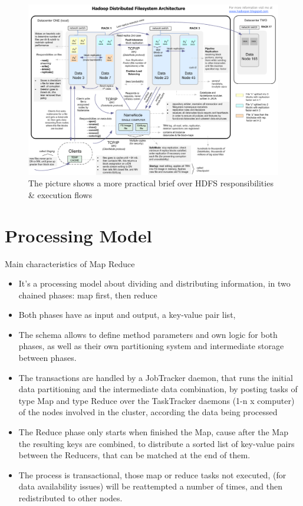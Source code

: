 \begin{figure}
\caption{The picture shows a more practical brief over HDFS responsibilities \& execution flows}
\label{tab:hdfs_resposibilities_and_execution_flow}
\centering
\includegraphics[scale=.33]{./img/HadoopDFSArchitecture.png}
\end{figure}


\section{Processing Model}
Main characteristics of Map Reduce   \\

\begin{itemize}
\item It's a processing model about dividing and distributing information, in two chained phases: map first, then reduce
\item Both phases have as input and output, a key-value pair list, 
\item The schema allows to define method parameters and own logic for both phases, as well as their own partitioning system and intermediate storage between phases.
\item The transactions are handled by a JobTracker daemon, that runs the initial data partitioning and the intermediate data combination, by posting tasks of type Map and type Reduce over the TaskTracker daemons (1-n x computer) of the nodes involved in the cluster, according the data being processed
\item The Reduce phase only starts when finished the Map, cause after the Map the resulting keys are combined, to distribute a sorted list of key-value pairs between the Reducers, that can be matched at the end of them.
\item The process is transactional, those map or reduce tasks not executed, (for data availability issues) will be reattempted a number of times, and then redistributed to other nodes.
\end{itemize}

